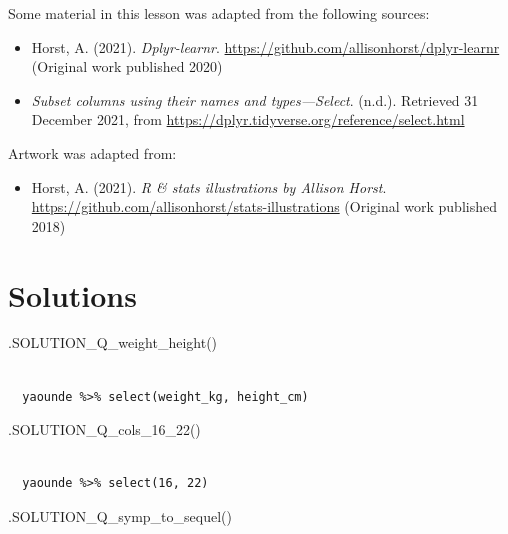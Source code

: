 \documentclass[
  letterpaper,
  DIV=11,
  numbers=noendperiod]{scrreprt}
\newenvironment{Shaded}{\begin{snugshade}}{\end{snugshade}}
\newcommand{\FunctionTok}[1]{\textcolor[rgb]{0.28,0.35,0.67}{#1}}
\newcommand{\NormalTok}[1]{\textcolor[rgb]{0.00,0.23,0.31}{#1}}
\providecommand{\tightlist}{%
  \setlength{\itemsep}{0pt}\setlength{\parskip}{0pt}}\usepackage{longtable,booktabs,array}
\begin{document}

Some material in this lesson was adapted from the following sources:

\begin{itemize}
\item
  Horst, A. (2021). \emph{Dplyr-learnr}.
  \url{https://github.com/allisonhorst/dplyr-learnr} (Original work
  published 2020)
\item
  \emph{Subset columns using their names and types---Select}. (n.d.).
  Retrieved 31 December 2021, from
  \url{https://dplyr.tidyverse.org/reference/select.html}
\end{itemize}

Artwork was adapted from:

\begin{itemize}
\tightlist
\item
  Horst, A. (2021). \emph{R \& stats illustrations by Allison Horst}.
  \url{https://github.com/allisonhorst/stats-illustrations} (Original
  work published 2018)
\end{itemize}

\section{Solutions}\label{solutions-1}

\begin{Shaded}
\begin{Highlighting}[]
\FunctionTok{.SOLUTION\_Q\_weight\_height}\NormalTok{()}
\end{Highlighting}
\end{Shaded}

\begin{verbatim}
 
  yaounde %>% select(weight_kg, height_cm)
\end{verbatim}

\begin{Shaded}
\begin{Highlighting}[]
\FunctionTok{.SOLUTION\_Q\_cols\_16\_22}\NormalTok{()}
\end{Highlighting}
\end{Shaded}

\begin{verbatim}
 
  yaounde %>% select(16, 22)
\end{verbatim}

\begin{Shaded}
\begin{Highlighting}[]
\FunctionTok{.SOLUTION\_Q\_symp\_to\_sequel}\NormalTok{()}
\end{Highlighting}
\end{Shaded}
\end{document}
